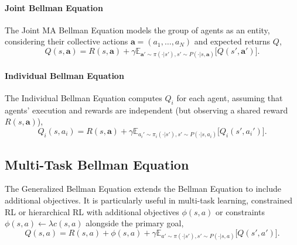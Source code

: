 \paragraph{Joint Bellman Equation} The Joint MA Bellman Equation models the group of agents as an entity, considering their collective actions $\mathbf{a} = (a_1, \dots, a_N)$ and expected returns $Q$,
\begin{equation}
Q(s, \mathbf{a}) = R(s, \mathbf{a}) + \gamma \mathbb{E}_{\mathbf{a}' \sim \pi(\cdot |s'), s' \sim P(\cdot | s, \mathbf{a})} \Big[ Q(s', \mathbf{a'}) \Big].
\end{equation}

\paragraph{Individual Bellman Equation} The Individual Bellman Equation computes $Q_i$ for each agent, assuming that agents' execution and rewards are independent (but observing a shared reward $R(s, \mathbf{a})$),
\begin{equation}
Q_i(s, a_i) = R(s, \mathbf{a}) + \gamma \mathbb{E}_{a_i' \sim \pi_i(\cdot |s'), s' \sim P(\cdot | s, a_i)} \Big[ Q_i(s', a_i') \Big].
\end{equation}

\subsection{Multi-Task Bellman Equation}
The Generalized Bellman Equation extends the Bellman Equation to include additional objectives. It is particularly useful in multi-task learning, constrained RL or hierarchical RL with additional objectives $\phi(s, a)$ or constraints $\phi(s, a)\gets\lambda c(s, a)$ alongside the primary goal,
\begin{equation}
Q(s, a) = R(s,a) + \phi(s, a) + \gamma \mathbb{E}_{a' \sim \pi(\cdot |s'), s' \sim P(\cdot | s, a)} \Big[ Q(s', a') \Big].
\end{equation}

\clearpage
